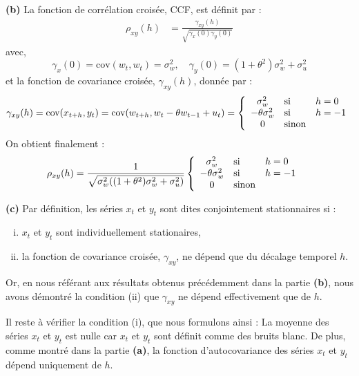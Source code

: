 \documentclass{homework}
\begin{document}
\textbf{(b)} La fonction de corrélation croisée, CCF, est définit par :
\begin{align*}
\rho_{xy}(h) &= \frac{\gamma_{xy}(h)}{\sqrt{\gamma_x(0)\gamma_y(0)}} 
\end{align*}
avec,
$$\gamma_x(0) = \text{cov}(w_t,w_t) = \sigma_w^2, \quad \gamma_y(0) = (1 + \theta^2)\sigma_w^2 + \sigma_u^2$$
et la fonction de covariance croisée, $\gamma_{xy}(h)$, donnée par :
$$
\gamma_{xy}(h) = \text{cov}(x_{t+h}, y_t) \\
               = \text{cov}(w_{t+h}, w_t - \theta w_{t-1} + u_t) \\
               = \left\{
                    \begin{array}{c l l}
                        \sigma_w^2 &\text{si}& h = 0\\
                        -\theta\sigma_w^2 &\text{si}& h = -1 \\
                        0 &\text{sinon}&
                    \end{array}
                \right.
$$
On obtient finalement :
\begin{align*}
\rho_{xy}(h) &= \frac{1}{\sqrt{\sigma_w^2((1 + \theta^2)\sigma_w^2 + \sigma_u^2)}}\left\{
                    \begin{array}{c l l}
                        \sigma_w^2 &\text{si}& h = 0\\
                        -\theta\sigma_w^2 &\text{si}& h = -1 \\
                        0 &\text{sinon}&
                    \end{array}
                \right.
\end{align*}

\textbf{(c)} Par définition, les séries $x_t$ et $y_t$ sont dites conjointement stationnaires si :
\begin{enumerate}[(i)]
    \item $x_t$ et $y_t$ sont individuellement stationaires,
    \item la fonction de covariance croisée, $\gamma_{xy}$, ne dépend que du décalage temporel $h$.
\end{enumerate}
Or, en nous référant aux résultats obtenus précédemment dans la partie \textbf{(b)}, nous avons démontré la condition (ii) que $\gamma_{xy}$ ne dépend effectivement que de $h$. 

Il reste à vérifier la condition (i), que nous formulons ainsi :
La moyenne des séries $x_t$ et $y_t$ est nulle car $x_t$ et $y_t$ sont définit comme des bruits blanc. De plus, comme montré dans la partie \textbf{(a)}, la fonction d'autocovariance des séries $x_t$ et $y_t$ dépend uniquement de $h$.
\end{document}
